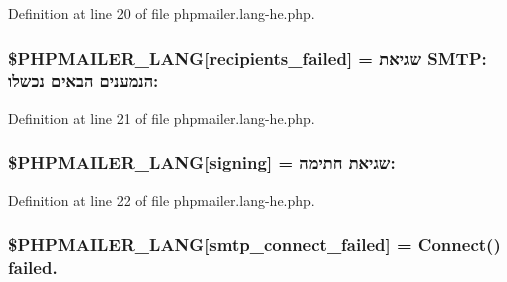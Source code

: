 Definition at line 20 of file phpmailer.\+lang-\/he.\+php.

\subsubsection[{\texorpdfstring{\$\+P\+H\+P\+M\+A\+I\+L\+E\+R\+\_\+\+L\+A\+NG}{$PHPMAILER_LANG}}]{\setlength{\rightskip}{0pt plus 5cm}\$P\+H\+P\+M\+A\+I\+L\+E\+R\+\_\+\+L\+A\+NG\mbox{[}\textquotesingle{}recipients\+\_\+failed\textquotesingle{}\mbox{]} = \textquotesingle{}שגיאת S\+M\+T\+P\+: הנמענים הבאים נכשלו\+: \textquotesingle{}}\hypertarget{phpmailer_8lang-he_8php_a7589d30bb9b368327c2df015f3e6bcba}{}\label{phpmailer_8lang-he_8php_a7589d30bb9b368327c2df015f3e6bcba}


Definition at line 21 of file phpmailer.\+lang-\/he.\+php.

\subsubsection[{\texorpdfstring{\$\+P\+H\+P\+M\+A\+I\+L\+E\+R\+\_\+\+L\+A\+NG}{$PHPMAILER_LANG}}]{\setlength{\rightskip}{0pt plus 5cm}\$P\+H\+P\+M\+A\+I\+L\+E\+R\+\_\+\+L\+A\+NG\mbox{[}\textquotesingle{}signing\textquotesingle{}\mbox{]} = \textquotesingle{}שגיאת חתימה\+: \textquotesingle{}}\hypertarget{phpmailer_8lang-he_8php_a68e437bdb9b968a5a67320f03d231565}{}\label{phpmailer_8lang-he_8php_a68e437bdb9b968a5a67320f03d231565}


Definition at line 22 of file phpmailer.\+lang-\/he.\+php.

\subsubsection[{\texorpdfstring{\$\+P\+H\+P\+M\+A\+I\+L\+E\+R\+\_\+\+L\+A\+NG}{$PHPMAILER_LANG}}]{\setlength{\rightskip}{0pt plus 5cm}\$P\+H\+P\+M\+A\+I\+L\+E\+R\+\_\+\+L\+A\+NG\mbox{[}\textquotesingle{}smtp\+\_\+connect\+\_\+failed\textquotesingle{}\mbox{]} =  Connect() failed.\textquotesingle{}}\hypertarget{phpmailer_8lang-he_8php_a7b321d4ca1e9df702403ed4c61aa0980}{}\label{phpmailer_8lang-he_8php_a7b321d4ca1e9df702403ed4c61aa0980}


